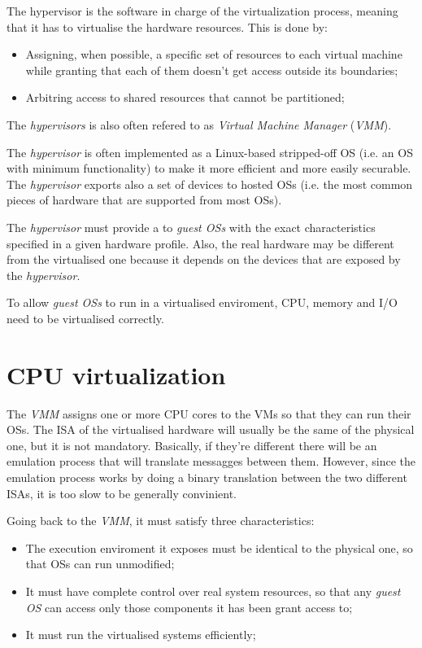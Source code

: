 \begin{definition}[Hypervisor]
    The hypervisor is the software in charge of the virtualization process,
    meaning that it has to virtualise the hardware resources. This is done by:
    \begin{itemize}
        \item Assigning, when possible, a specific set of resources to each
        virtual machine while granting that each of them doesn't get access
        outside its boundaries;
        \item Arbitring access to shared resources that cannot be partitioned;
    \end{itemize}
\end{definition}
\begin{note}
    The \emph{hypervisors} is also often refered to as \emph{Virtual Machine
    Manager} (\emph{VMM}).
\end{note}
\noindent
The \emph{hypervisor} is often implemented as a Linux-based stripped-off OS
(i.e. an OS with minimum functionality) to make it more efficient
and more easily securable. The \emph{hypervisor} exports also a set of
 devices to hosted OSs (i.e. the most common pieces of hardware
that are supported from most OSs).

The \emph{hypervisor} must provide a  to \emph{guest
OSs} with the exact characteristics specified in a given hardware profile.
Also, the real hardware may be different from the virtualised one because it
depends on the devices that are exposed by the \emph{hypervisor}.

To allow \emph{guest OSs} to run in a virtualised enviroment, CPU, memory and
I/O need to be virtualised correctly.

\section{CPU virtualization}
The \emph{VMM} assigns one or more CPU cores to the VMs so that they can run
their OSs. The ISA of the virtualised hardware will usually be the same
of the physical one, but it is not mandatory. Basically, if they're different
there will be an emulation process that will translate messagges between them.
However, since the emulation process works by doing a binary translation between
the two different ISAs, it is too slow to be generally convinient.

Going back to the \emph{VMM}, it must satisfy three characteristics:
\begin{itemize}
    \item The execution enviroment it exposes must be identical to the
    physical one, so that OSs can run unmodified;
    \item It must have complete control over real system resources, so that
    any \emph{guest OS} can access only those components it has been grant access
    to;
    \item It must run the virtualised systems efficiently;
\end{itemize}

